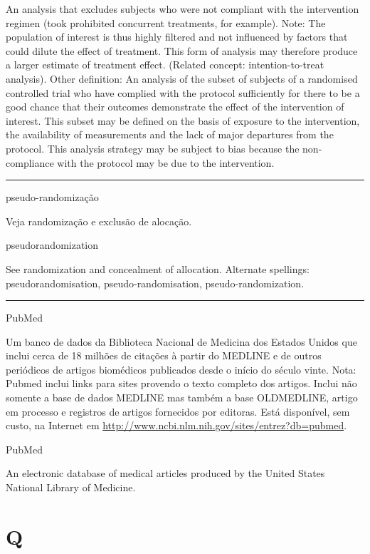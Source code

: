 \documentclass[
]{book}
\begin{document}
An analysis that excludes subjects who were not compliant with the intervention regimen (took prohibited concurrent treatments, for example). Note: The population of interest is thus highly filtered and not influenced by factors that could dilute the effect of treatment. This form of analysis may therefore produce a larger estimate of treatment effect. (Related concept: intention-to-treat analysis). Other definition: An analysis of the subset of subjects of a randomised controlled trial who have complied with the protocol sufficiently for there to be a good chance that their outcomes demonstrate the effect of the intervention of interest. This subset may be defined on the basis of exposure to the intervention, the availability of measurements and the lack of major departures from the protocol. This analysis strategy may be subject to bias because the non-compliance with the protocol may be due to the intervention.

\begin{center}\rule{0.5\linewidth}{0.5pt}\end{center}

pseudo-randomização

Veja randomização e exclusão de alocação.

pseudorandomization

See randomization and concealment of allocation. Alternate spellings: pseudorandomisation, pseudo-randomisation, pseudo-randomization.

\begin{center}\rule{0.5\linewidth}{0.5pt}\end{center}

PubMed

Um banco de dados da Biblioteca Nacional de Medicina dos Estados Unidos que inclui cerca de 18 milhões de citações à partir do MEDLINE e de outros periódicos de artigos biomédicos publicados desde o início do século vinte. Nota: Pubmed inclui links para sites provendo o texto completo dos artigos. Inclui não somente a base de dados MEDLINE mas também a base OLDMEDLINE, artigo em processo e registros de artigos fornecidos por editoras. Está disponível, sem custo, na Internet em \url{http://www.ncbi.nlm.nih.gov/sites/entrez?db=pubmed}.

PubMed

An electronic database of medical articles produced by the United States National Library of Medicine.

\hypertarget{q}{%
\chapter*{Q}\label{q}}
\end{document}
